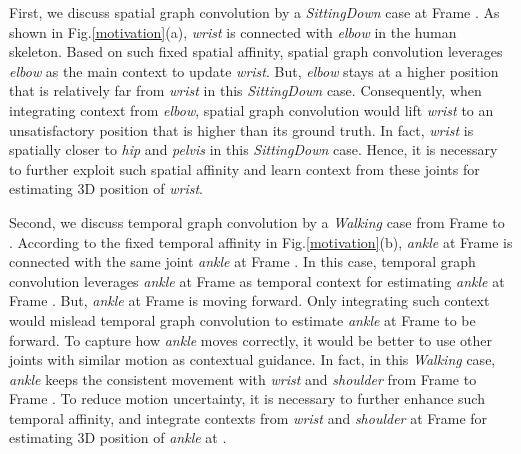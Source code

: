 \documentclass[journal]{IEEEtran}
\begin{document}
First,
we discuss spatial graph convolution by a \textit{SittingDown} case at Frame .
As shown in Fig.\ref{motivation}(a),
\textit{wrist} is connected with \textit{elbow} in the human skeleton.
Based on such fixed spatial affinity,
spatial graph convolution leverages \textit{elbow} as the main context to update \textit{wrist}.
But,
\textit{elbow} stays at a higher position that is relatively far from \textit{wrist} in this \textit{SittingDown} case.
Consequently,
when integrating context from \textit{elbow},
spatial graph convolution would lift \textit{wrist} to an unsatisfactory position that is higher than its ground truth.
In fact,
\textit{wrist} is spatially closer to \textit{hip} and \textit{pelvis} in this \textit{SittingDown} case.
Hence,
it is necessary to further exploit such spatial affinity and learn context from these joints for estimating 3D position of \textit{wrist}.



Second,
we discuss temporal graph convolution by a \textit{Walking} case from Frame  to .
According to the fixed temporal affinity in Fig.\ref{motivation}(b),
\textit{ankle} at Frame  is connected with the same joint \textit{ankle} at Frame .
In this case,
temporal graph convolution leverages \textit{ankle} at Frame  as temporal context for estimating \textit{ankle} at Frame .
But,
\textit{ankle} at Frame  is moving forward.
Only integrating such context would mislead temporal graph convolution to estimate \textit{ankle} at Frame  to be forward.
To capture how \textit{ankle} moves correctly,
it would be better to use other joints with similar motion as contextual guidance.
In fact,
in this \textit{Walking} case,
\textit{ankle} keeps the consistent movement with \textit{wrist} and \textit{shoulder} from Frame  to Frame .
To reduce motion uncertainty,
it is necessary to further enhance such temporal affinity,
and integrate contexts from \textit{wrist} and \textit{shoulder} at Frame  for estimating 3D position of \textit{ankle} at .
\end{document}
